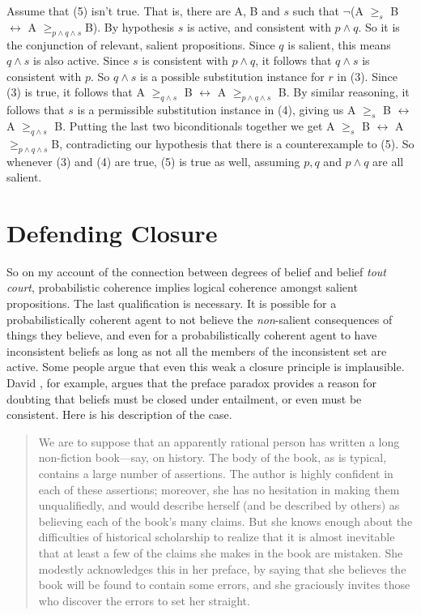 \noindent Assume that (5) isn't true. That is, there are A, B and \(s\) such that \(\neg\)(A \(\geq_s\) B \(\leftrightarrow\) A \(\geq _{p \wedge q \wedge s}\)B). By hypothesis \(s\) is active, and consistent with \(p \wedge q\). So it is the conjunction of relevant, salient propositions. Since \(q\) is salient, this means \(q \wedge s\) is also active. Since \(s\) is consistent with \(p \wedge q\), it follows that \(q \wedge s\) is consistent with \(p\). So \(q \wedge s\) is a possible substitution instance for \(r\) in (3). Since (3) is true, it follows that A \(\geq _{q \wedge s}\) B \(\leftrightarrow\) A \(\geq _{p \wedge q \wedge s}\) B. By similar reasoning, it follows that \(s\) is a permissible substitution instance in (4), giving us A \(\geq_s\) B \(\leftrightarrow\) A \(\geq _{q \wedge s}\) B. Putting the last two biconditionals together we get A \(\geq_s\) B \(\leftrightarrow\) A \(\geq _{p \wedge q \wedge s}\)B, contradicting our hypothesis that there is a counterexample to (5). So whenever (3) and (4) are true, (5) is true as well, assuming \(p, q\) and \(p \wedge q\) are all salient.


\section{Defending Closure}

So on my account of the connection between degrees of belief and belief \textit{tout court}, probabilistic coherence implies logical coherence amongst salient propositions. The last qualification is necessary. It is possible for a probabilistically coherent agent to not believe the \textit{non}{}-salient consequences of things they believe, and even for a probabilistically coherent agent to have inconsistent beliefs as long as not all the members of the inconsistent set are active. Some people argue that even this weak a closure principle is implausible. David \citet{Christensen2005}, for example, argues that the preface paradox provides a reason for doubting that beliefs must be closed under entailment, or even must be consistent. Here is his description of the case.

\begin{quote}
We are to suppose that an apparently rational person has written a long non-fiction book---say, on history. The body of the book, as is typical, contains a large number of assertions. The author is highly confident in each of these assertions; moreover, she has no hesitation in making them unqualifiedly, and would describe herself (and be described by others) as believing each of the book's many claims. But she knows enough about the difficulties of historical scholarship to realize that it is almost inevitable that at least a few of the claims she makes in the book are mistaken. She modestly acknowledges this in her preface, by saying that she believes the book will be found to contain some errors, and she graciously invites those who discover the errors to set her straight. \citep[33-4]{Christensen2005}
\end{quote}


